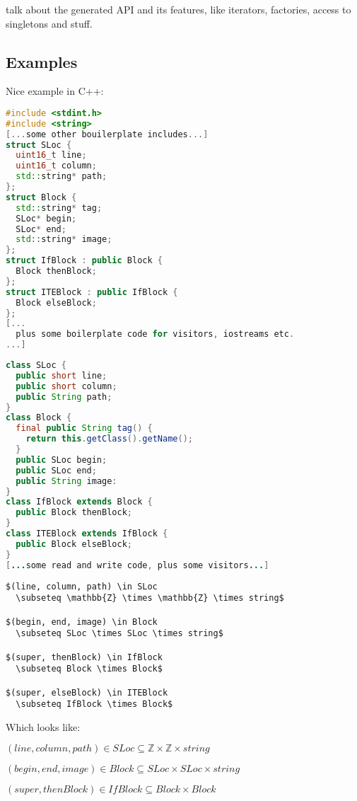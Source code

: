 \documentclass[a4paper,10pt]{article}
\begin{document}
talk about the generated API and its features, like iterators, factories, access to singletons and stuff.

\subsection{Examples}

Nice example in C++:
\begin{lstlisting}[label=cppExample,caption=C++ Examples,language=C++]
#include <stdint.h>
#include <string>
[...some other bouilerplate includes...]
struct SLoc {
  uint16_t line;
  uint16_t column;
  std::string* path;
};
struct Block {
  std::string* tag;
  SLoc* begin;
  SLoc* end;
  std::string* image;
};
struct IfBlock : public Block {
  Block thenBlock;
};
struct ITEBlock : public IfBlock {
  Block elseBlock;
};
[...
  plus some boilerplate code for visitors, iostreams etc.
...]
\end{lstlisting}

\begin{lstlisting}[label=javaExample,caption=Java Examples,language=Java]
class SLoc {
  public short line;
  public short column;
  public String path;
}
class Block {
  final public String tag() {
    return this.getClass().getName();
  }
  public SLoc begin;
  public SLoc end;
  public String image:
}
class IfBlock extends Block {
  public Block thenBlock;
}
class ITEBlock extends IfBlock {
  public Block elseBlock;
}
[...some read and write code, plus some visitors...]
\end{lstlisting}


\begin{lstlisting}[label=latexExample,caption=LaTeX Examples,language={[LaTeX]TeX}]
$(line, column, path) \in SLoc
  \subseteq \mathbb{Z} \times \mathbb{Z} \times string$

$(begin, end, image) \in Block
  \subseteq SLoc \times SLoc \times string$

$(super, thenBlock) \in IfBlock
  \subseteq Block \times Block$

$(super, elseBlock) \in ITEBlock
  \subseteq IfBlock \times Block$
\end{lstlisting}
Which looks like:

$(line, column, path) \in SLoc \subseteq \mathbb{Z} \times \mathbb{Z} \times string$

$(begin, end, image) \in Block \subseteq SLoc \times SLoc \times string$

$(super, thenBlock) \in IfBlock \subseteq Block \times Block$
\end{document}
